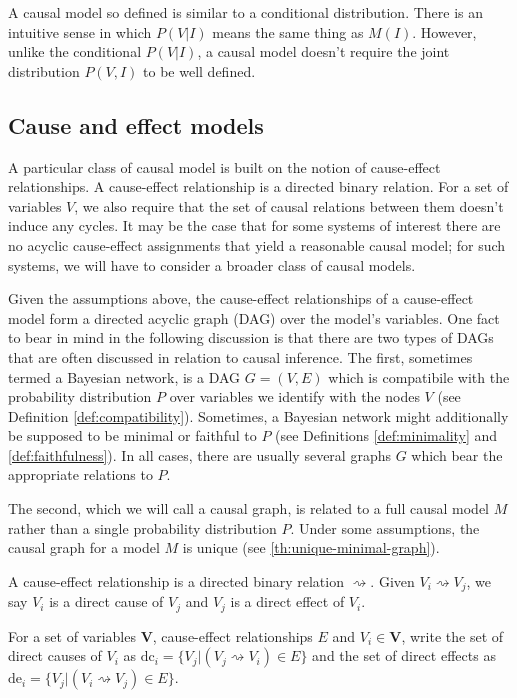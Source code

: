 \begin{remark}
A causal model so defined is similar to a conditional distribution. There is an intuitive sense in which $P(V|I)$ means the same thing as $M(I)$. However, unlike the conditional $P(V|I)$, a causal model doesn't require the joint distribution $P(V,I)$ to be well defined.
\end{remark}

\subsection{Cause and effect models}

A particular class of causal model is built on the notion of cause-effect relationships. A cause-effect relationship is a directed binary relation. For a set of variables $V$, we also require that the set of causal relations between them doesn't induce any cycles. It may be the case that for some systems of interest there are no acyclic cause-effect assignments that yield a reasonable causal model; for such systems, we will have to consider a broader class of causal models. 

Given the assumptions above, the cause-effect relationships of a cause-effect model form a directed acyclic graph (DAG) over the model's variables. One fact to bear in mind in the following discussion is that there are two types of DAGs that are often discussed in relation to causal inference. The first, sometimes termed a Bayesian network, is a DAG $G=(V,E)$ which is compatibile with the probability distribution $P$ over variables we identify with the nodes $V$ (see Definition \ref{def:compatibility}). Sometimes, a Bayesian network might additionally be supposed to be minimal or faithful to $P$ (see Definitions \ref{def:minimality} and \ref{def:faithfulness}). In all cases, there are usually several graphs $G$ which bear the appropriate relations to $P$.

The second, which we will call a causal graph, is related to a full causal model $M$ rather than a single probability distribution $P$. Under some assumptions, the causal graph for a model $M$ is unique (see \ref{th:unique-minimal-graph}). 

\begin{definition}
A cause-effect relationship is a directed binary relation $\rightsquigarrow$. Given $V_i\rightsquigarrow V_j$, we say $V_i$ is a direct cause of $V_j$ and $V_j$ is a direct effect of $V_i$.

For a set of variables $\mathbf{V}$, cause-effect relationships $E$ and $V_i\in\mathbf{V}$, write  the set of direct causes of $V_i$ as $\mathrm{dc}_i=\{V_j|(V_j\rightsquigarrow V_i)\in E\}$ and the set of direct effects as $\mathrm{de}_i=\{V_j|(V_i\rightsquigarrow V_j)\in E\}$.
\end{definition}

